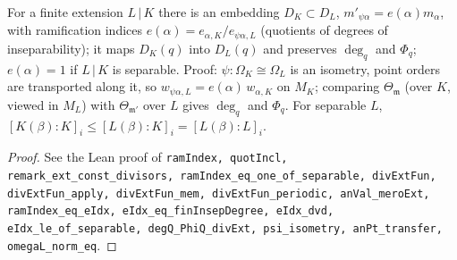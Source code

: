\begin{remark}
\label{rem:S2-ext-const}
\leanok
For a finite extension $L\,|\,K$ there is an embedding $D_K\subset D_L$, $m'_{\psi\alpha}=e(\alpha)m_\alpha$, with ramification indices $e(\alpha)=e_{\alpha,K}/e_{\psi\alpha,L}$ (quotients of degrees of inseparability); it maps $D_K(q)$ into $D_L(q)$ and preserves $\deg_q$ and $\Phi_q$; $e(\alpha)=1$ if $L\,|\,K$ is separable. Proof: $\psi:\Omega_K\cong\Omega_L$ is an isometry, point orders are transported along it, so $w_{\psi\alpha,L}=e(\alpha)\,w_{\alpha,K}$ on $M_K$; comparing $\Theta_{\mathfrak m}$ (over $K$, viewed in $M_L$) with $\Theta_{\mathfrak m'}$ over $L$ gives $\deg_q$ and $\Phi_q$. For separable $L$, $[K(\beta):K]_i\le[L(\beta):K]_i=[L(\beta):L]_i$.
\end{remark}
\begin{proof}
\leanok
See the Lean proof of \texttt{ramIndex, quotIncl, remark\_ext\_const\_divisors, ramIndex\_eq\_one\_of\_separable, divExtFun, divExtFun\_apply, divExtFun\_mem, divExtFun\_periodic, anVal\_meroExt, ramIndex\_eq\_eIdx, eIdx\_eq\_finInsepDegree, eIdx\_dvd, eIdx\_le\_of\_separable, degQ\_PhiQ\_divExt, psi\_isometry, anPt\_transfer, omegaL\_norm\_eq}.
\end{proof}

